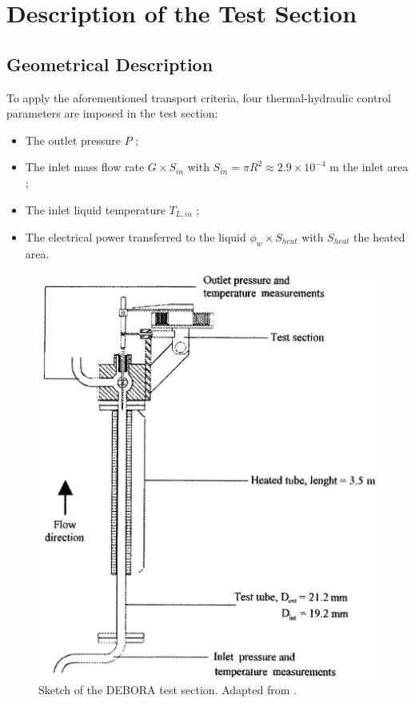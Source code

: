 \section{Description of the Test Section}

\subsection{Geometrical Description}
To apply the aforementioned transport criteria, four thermal-hydraulic control parameters are imposed in the test section:

\begin{itemize}
\item The outlet pressure $P$ ;
\item The inlet mass flow rate $G \times S_{in}$ with $S_{in} = \pi R^{2} \approx 2.9 \times 10^{-4}$ m the inlet area ;
\item The inlet liquid temperature $T_{L,in}$ ;
\item The electrical power transferred to the liquid $\phi_{w}\times S_{heat}$ with $S_{heat}$ the heated area. 
\end{itemize}

\begin{figure}[!h]
\centering
\includegraphics[width=0.7\linewidth]{img/DEBORA/debora_sketch.png}
\caption{Sketch of the DEBORA test section. Adapted from \cite{garnier_local_2001}.}
\label{fig:sketch_debora}
\end{figure}


